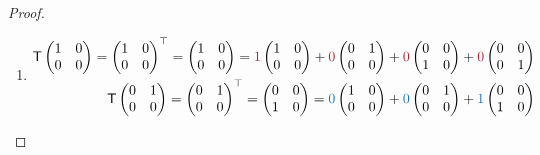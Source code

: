 \begin{proof} \ 
\begin{enumerate}
\item
\begin{align*}
    \T \begin{pmatrix} 1 & 0 \\ 0 & 0 \end{pmatrix}
        = \begin{pmatrix} 1 & 0 \\ 0 & 0 \end{pmatrix}^\top
        = \begin{pmatrix} 1 & 0 \\ 0 & 0 \end{pmatrix}
        = \MAROON{1} \begin{pmatrix} 1 & 0 \\ 0 & 0 \end{pmatrix}
        + \MAROON{0} \begin{pmatrix} 0 & 1 \\ 0 & 0 \end{pmatrix}
        + \MAROON{0} \begin{pmatrix} 0 & 0 \\ 1 & 0 \end{pmatrix}
        + \MAROON{0} \begin{pmatrix} 0 & 0 \\ 0 & 1 \end{pmatrix} \\
    \T \begin{pmatrix} 0 & 1 \\ 0 & 0 \end{pmatrix}
        = \begin{pmatrix} 0 & 1 \\ 0 & 0 \end{pmatrix}^\top
        = \begin{pmatrix} 0 & 0 \\ 1 & 0 \end{pmatrix}
        = \BLUE{0} \begin{pmatrix} 1 & 0 \\ 0 & 0 \end{pmatrix}
        + \BLUE{0} \begin{pmatrix} 0 & 1 \\ 0 & 0 \end{pmatrix}
        + \BLUE{1} \begin{pmatrix} 0 & 0 \\ 1 & 0 \end{pmatrix}

\end{align*}
\end{enumerate}
\end{proof}
